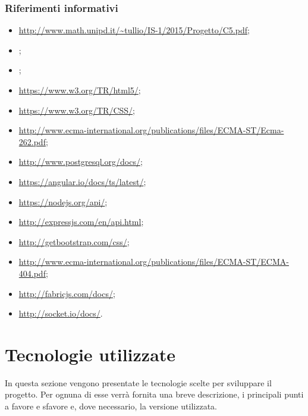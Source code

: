 \documentclass[a4paper, titlepage]{article}
\begin{document}
\subsubsection{Riferimenti informativi}
\begin{itemize}
\item {}  \url{http://www.math.unipd.it/~tullio/IS-1/2015/Progetto/C5.pdf};

\item {} \Gldoc;

\item {} \ARdoc;

\item {} \url{https://www.w3.org/TR/html5/};

\item {} \url{https://www.w3.org/TR/CSS/};

\item {} \url{http://www.ecma-international.org/publications/files/ECMA-ST/Ecma-262.pdf};

\item {} \url{http://www.postgresql.org/docs/};

\item {} \url{https://angular.io/docs/ts/latest/};

\item {} \url{https://nodejs.org/api/};

\item {} \url{http://expressjs.com/en/api.html};

\item {} \url{http://getbootstrap.com/css/};

\item {} \url{http://www.ecma-international.org/publications/files/ECMA-ST/ECMA-404.pdf};

\item {} \url{http://fabricjs.com/docs/};

\item {} \url{http://socket.io/docs/}.

\end{itemize}

\newpage

\section{Tecnologie utilizzate}
In questa sezione vengono presentate le tecnologie scelte per sviluppare il progetto. Per ognuna di esse verrà fornita una breve descrizione, i principali punti a favore e sfavore e, dove necessario, la versione utilizzata.
\end{document}
